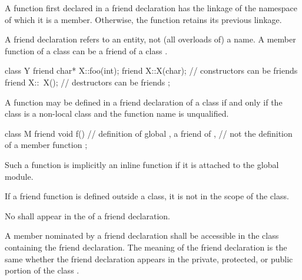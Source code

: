 \pnum
{}%
A function first declared in a friend declaration
has the linkage of the namespace of which it is a member.
Otherwise, the function retains its previous linkage.

\pnum
{}%
\begin{note}
A friend declaration refers to an entity, not (all overloads of) a name.
A member function of a class
can be a friend of
a class
.
%
\begin{example}
\begin{codeblock}
class Y {
  friend char* X::foo(int);
  friend X::X(char);            // constructors can be friends
  friend X::~X();               // destructors can be friends
};
\end{codeblock}
\end{example}
\end{note}

\pnum
{}%
A function may be defined in a friend declaration of a class if and only if the
class is a non-local class and the function name is unqualified.
\begin{example}
\begin{codeblock}
class M {
  friend void f() { }           // definition of global , a friend of ,
                                // not the definition of a member function
};
\end{codeblock}
\end{example}

\pnum
Such a function is implicitly an inline function
if it is attached to the global module.
\begin{note}
If a friend function is defined outside a class,
it is not in the scope of the class.
\end{note}

\pnum
No
shall appear in the
of a friend declaration.

\pnum
{}%
A member nominated by a friend declaration shall be accessible in the
class containing the friend declaration.
The meaning of the friend declaration is the same whether the friend declaration
appears in the private, protected, or public
portion of the class
.


